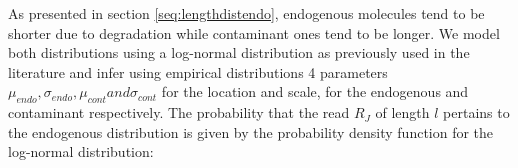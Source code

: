 \documentclass[a4paper,12pt]{article}
\begin{document}





%
%
%
%
%
%
%
%
%

As presented in section \ref{seq:lengthdistendo}, endogenous molecules tend to be shorter due to degradation while contaminant ones tend to be longer. We model both distributions using a log-normal distribution as previously used in the literature \cite{schmutzi} and infer using empirical distributions 4 parameters $\mu_{endo}, \sigma_{endo}, \mu_{cont} and \sigma_{cont}$ for the location and scale, for the endogenous and contaminant respectively. The probability that the read $R_J$ of length $l$ pertains to the endogenous distribution is given by the probability density function for the log-normal distribution:
\end{document}
